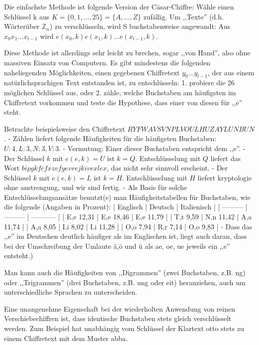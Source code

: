 \documentclass[a4paper]{article}
\begin{document}
\begin{multicols}{3}
        Die einfachste Methode ist folgende Version der Cäsar-Chiffre: Wähle einen Schlüssel k aus $K=\{0,1,...,25\}=\{A,...,Z\}$ zufällig. Um ,,Texte'' (d.h. Wörterüber $\mathbb{Z}_n$) zu verschlüsseln, wird S buchstabenweise angewandt: Aus $x_0 x_1...x_{l-1}$ wird $e(x_0,k)e(x_1,k)...e(x_{l-1},k)$.

        Diese Methode ist allerdings sehr leicht zu brechen, sogar ,,von Hand'', also ohne massiven Einsatz von Computern. Es gibt mindestens die folgenden naheliegenden Möglichkeiten, einen gegebenen Chiffretext $y_0...y_{l-1}$, der aus einem natürlichsprachigen Text entstanden ist, zu entschlüsseln:
        1. probiere die 26 möglichen Schlüssel aus, oder
        2. zähle, welche Buchstaben am häufigsten im Chiffretext vorkommen und teste die Hypothese, dass einer von diesen für ,,e'' steht.

        Betrachte beispielsweise den Chiffretext $RYFWAVSVNPLVOULHUZAYLUNBUN$.
        - Zählen liefert folgende Häufigkeiten für die häufigsten Buchstaben: $U:4,L:3,N:3,V:3$.
        - Vermutung: Einer dieser Buchstaben entspricht dem ,,e''.
        - Der Schlüssel $k$ mit $e(e,k)=U$ ist $k=Q$. Entschlüsselung mit $Q$ liefert das Wort $bipgkfcfxzvfyevrejkivexlex$, das nicht sehr sinnvoll erscheint.
        - Der Schlüssel $k$ mit $e(e,k)=L$ ist $k=H$. Entschlüsselung mit $H$ liefert kryptologie ohne anstrengung, und wir sind fertig.
        - Als Basis für solche Entschlüsselungsansätze benutzt(e) man Häufigkeitstabellen für Buchstaben, wie die folgende (Angaben in Prozent):
        | Englisch  | Deutsch   | Italienisch |
        | --------- | --------- | ----------- |
        | E,e 12,31 | E,e 18,46 | E,e 11,79   |
        | T,t 9,59  | N,n 11,42 | A,a 11,74   |
        | A,a 8,05  | I,i 8,02  | I,i 11,28   |
        | O,o 7,94  | R,r 7,14  | O,o 9,83    |
        - Dass das ,,e'' im Deutschen deutlich häufiger als im Englischen ist, liegt auch daran, dass bei der Umschreibung der Umlaute ä,ö und ü als ae, oe, ue jeweils ein ,,e'' entsteht.)

        Man kann auch die Häufigkeiten von ,,Digrammen'' (zwei Buchstaben, z.B. ng) oder ,,Trigrammen''  (drei Buchstaben, z.B. ung oder eit) heranziehen, auch um unterschiedliche Sprachen zu unterscheiden.

        Eine unangenehme Eigenschaft bei der wiederholten Anwendung von reinen Verschiebechiffren ist, dass identische Buchstaben stets gleich verschlüsselt werden. Zum Beispiel hat unabhängig vom Schlüssel der Klartext otto stets zu einem Chiffretext mit dem Muster abba.


\end{multicols}
\end{document}
